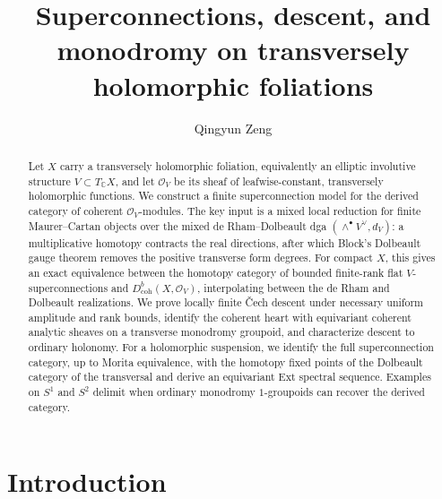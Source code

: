 \documentclass[12pt]{amsart}
\theoremstyle{definition}
\theoremstyle{remark}
\numberwithin{equation}{section}
\newcommand{\CO}{\mathcal O}
\newcommand{\C}{\mathbb C}
\begin{document}
\title[Superconnections on transversely holomorphic foliations]
{Superconnections, descent, and monodromy on transversely holomorphic
foliations}

\author{Qingyun Zeng}
\address{Department of Mathematics, University of Pennsylvania,
Philadelphia, PA 19104}


\begin{abstract}
Let \(X\) carry a transversely holomorphic foliation, equivalently an
elliptic involutive structure \(V\subset T_{\C}X\), and let \(\CO_V\) be its
sheaf of leafwise-constant, transversely holomorphic functions.  We construct
a finite superconnection model for the derived category of coherent
\(\CO_V\)-modules.  The key input is a mixed local reduction for finite
Maurer--Cartan objects over the mixed de Rham--Dolbeault dga
\((\wedge^\bullet V^\vee,d_V)\): a multiplicative homotopy contracts the
real directions, after which Block's Dolbeault gauge theorem removes the
positive transverse form degrees.  For compact \(X\), this gives an exact
equivalence between the homotopy category of bounded finite-rank flat
\(V\)-superconnections and \(D^b_{\mathrm{coh}}(X,\CO_V)\), interpolating
between the de Rham and Dolbeault realizations.  We prove locally finite
\v{C}ech descent under necessary uniform amplitude and rank bounds, identify
the coherent heart with equivariant coherent analytic sheaves on a
transverse monodromy groupoid, and characterize descent to ordinary
holonomy.  For a holomorphic suspension, we identify the full
superconnection category, up to Morita equivalence, with the homotopy fixed
points of the Dolbeault category of the transversal and derive an
equivariant Ext spectral sequence.  Examples on \(S^1\) and \(S^2\) delimit
when ordinary monodromy \(1\)-groupoids can recover the derived category.
\end{abstract}

\maketitle

\section{Introduction}
\end{document}
